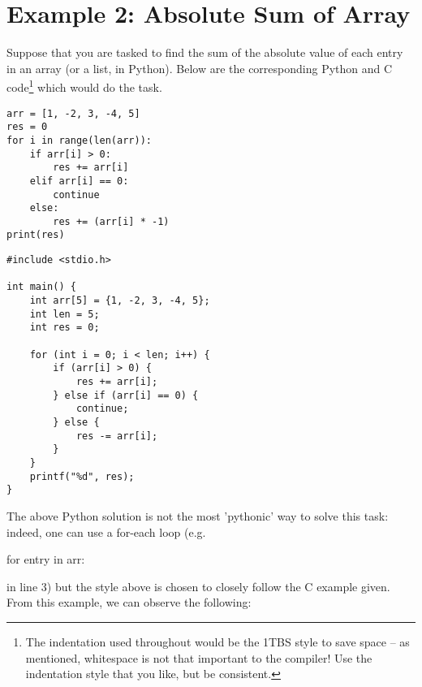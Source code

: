 \newpage
\section{Example 2: Absolute Sum of Array}
Suppose that you are tasked to find the sum of the absolute value of each entry in an array (or a list, in Python). Below are the corresponding Python and C code\footnote{The indentation used throughout would be the 1TBS style to save space -- as mentioned, whitespace is not that important to the compiler! Use the indentation style that you like, but be consistent.} which would do the task.

\noindent
\begin{minipage}{0.40\textwidth}
\begin{verbatim}
arr = [1, -2, 3, -4, 5]
res = 0
for i in range(len(arr)):
    if arr[i] > 0:
        res += arr[i]
    elif arr[i] == 0:
        continue
    else:
        res += (arr[i] * -1)
print(res)
\end{verbatim}
\end{minipage}
\hfill
\begin{minipage}{0.40\textwidth}
\begin{verbatim}
#include <stdio.h>

int main() {
    int arr[5] = {1, -2, 3, -4, 5};
    int len = 5;
    int res = 0;
    
    for (int i = 0; i < len; i++) {
        if (arr[i] > 0) {
            res += arr[i];
        } else if (arr[i] == 0) {
            continue;
        } else {
            res -= arr[i];
        }
    }
    printf("%d", res);
}
\end{verbatim}
\end{minipage}


The above Python solution is not the most 'pythonic' way to solve this task: indeed, one can use a for-each loop (e.g. \begin{typewriter}for entry in arr:\end{typewriter} in line 3) but the style above is chosen to closely follow the C example given. From this example, we can observe the following:

